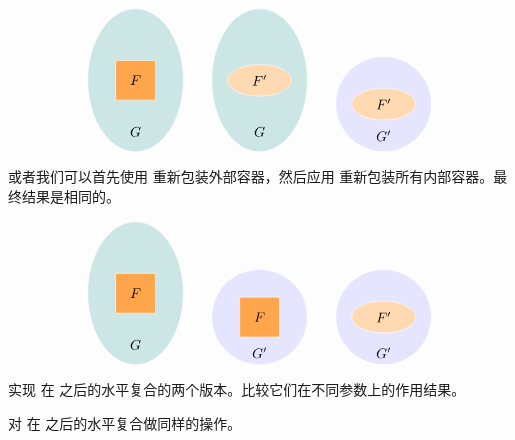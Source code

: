 \documentclass[DaoFP]{subfiles}
\begin{document}
\[
\begin{tikzpicture}
\filldraw[fill=blue!50!green!20, draw=white] (0, 0) ellipse (1.2 and 1.8);
\filldraw[fill=orange!70, draw=white] (-0.5, -0.5) rectangle (0.5, 0.5);
\node at (0, 0) {$F$};
\node at (0, -1.3) {$G$};
\end{tikzpicture}
\hspace{20pt}
\begin{tikzpicture}
\filldraw[fill=blue!50!green!20, draw=white] (0, 0) ellipse (1.2 and 1.8);
\filldraw[fill=orange!30, draw=white] (0, 0) ellipse (0.8 and 0.4);
\node at (0, 0) {$F'$};
\node at (0, -1.3) {$G$};
\end{tikzpicture}
\hspace{20pt}
\begin{tikzpicture}
\filldraw[fill=blue!10, draw=white] (0, 0) circle (1.2);
\filldraw[fill=orange!30, draw=white] (0, 0) ellipse (0.8 and 0.4);
\node at (0, 0) {$F'$};
\node at (0, -0.8) {$G'$};
\end{tikzpicture}
\]

或者我们可以首先使用  重新包装外部容器，然后应用  重新包装所有内部容器。最终结果是相同的。

\[
\begin{tikzpicture}
\filldraw[fill=blue!50!green!20, draw=white] (0, 0) ellipse (1.2 and 1.8);
\filldraw[fill=orange!70, draw=white] (-0.5, -0.5) rectangle (0.5, 0.5);
\node at (0, 0) {$F$};
\node at (0, -1.3) {$G$};
\end{tikzpicture}
\hspace{20pt}
\begin{tikzpicture}
\filldraw[fill=blue!10, draw=white] (0, 0) circle (1.2);
\filldraw[fill=orange!70, draw=white] (-0.5, -0.5) rectangle (0.5, 0.5);
\node at (0, 0) {$F$};
\node at (0, -0.9) {$G'$};
\end{tikzpicture}
\hspace{20pt}
\begin{tikzpicture}
\filldraw[fill=blue!10, draw=white] (0, 0) circle (1.2);
\filldraw[fill=orange!30, draw=white] (0, 0) ellipse (0.8 and 0.4);
\node at (0, 0) {$F'$};
\node at (0, -0.9) {$G'$};
\end{tikzpicture}
\]

\begin{exercise}
实现  在  之后的水平复合的两个版本。比较它们在不同参数上的作用结果。
\end{exercise}

\begin{exercise}
对  在  之后的水平复合做同样的操作。
\end{exercise}
\end{document}
